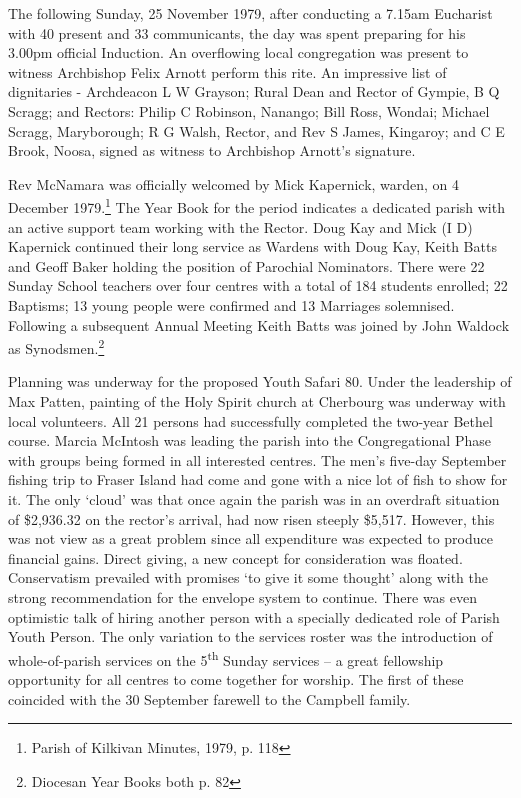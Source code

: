 The following Sunday, 25 November 1979, after conducting a 7.15am
Eucharist with 40 present and 33 communicants, the day was spent
preparing for his 3.00pm official Induction. An overflowing local
congregation was present to witness Archbishop Felix Arnott perform this
rite. An impressive list of dignitaries - Archdeacon L W Grayson; Rural
Dean and Rector of Gympie, B Q Scragg; and Rectors: Philip C Robinson,
Nanango; Bill Ross, Wondai; Michael Scragg, Maryborough; R G Walsh,
Rector, and Rev S James, Kingaroy; and C E Brook, Noosa, signed as
witness to Archbishop Arnott's signature.

Rev McNamara was officially welcomed by Mick Kapernick, warden, on 4
December 1979.\footnote{Parish of Kilkivan Minutes, 1979, p. 118} The
Year Book for the period indicates a dedicated parish with an active
support team working with the Rector. Doug Kay and Mick (I D) Kapernick
continued their long service as Wardens with Doug Kay, Keith Batts and
Geoff Baker holding the position of Parochial Nominators. There were 22
Sunday School teachers over four centres with a total of 184 students
enrolled; 22 Baptisms; 13 young people were confirmed and 13 Marriages
solemnised. Following a subsequent Annual Meeting Keith Batts was joined
by John Waldock as Synodsmen.\footnote{Diocesan Year Books both p. 82}

Planning was underway for the proposed Youth Safari 80. Under the
leadership of Max Patten, painting of the Holy Spirit church at
Cherbourg was underway with local volunteers. All 21 persons had
successfully completed the two-year Bethel course. Marcia McIntosh was
leading the parish into the Congregational Phase with groups being
formed in all interested centres. The men's five-day September fishing
trip to Fraser Island had come and gone with a nice lot of fish to show
for it. The only `cloud' was that once again the parish was in an
overdraft situation of \$2,936.32 on the rector's arrival, had now risen
steeply \$5,517. However, this was not view as a great problem since all
expenditure was expected to produce financial gains. Direct giving, a
new concept for consideration was floated. Conservatism prevailed with
promises `to give it some thought' along with the strong recommendation
for the envelope system to continue. There was even optimistic talk of
hiring another person with a specially dedicated role of Parish Youth
Person. The only variation to the services roster was the introduction
of whole-of-parish services on the 5\textsuperscript{th} Sunday services
-- a great fellowship opportunity for all centres to come together for
worship. The first of these coincided with the 30 September farewell to
the Campbell family.

